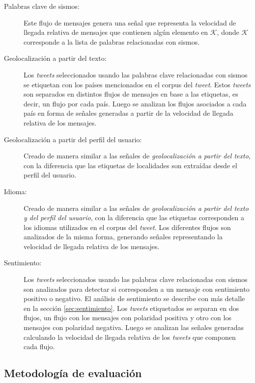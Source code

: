 \begin{description}

\item[Palabras clave de sismos:] Este flujo de mensajes genera una señal que representa la velocidad de llegada relativa de mensajes que contienen algún elemento en $\mathcal{K}$, donde $\mathcal{K}$ corresponde a la lista de palabras relacionadas con sismos. 
\item[Geolocalización a partir del texto:] Los \textit{tweets} seleccionados usando las palabras clave relacionadas con sismos se etiquetan con los países mencionados en el corpus del \textit{tweet}. Estos \textit{tweets} son separados en distintos flujos de mensajes en base a las etiquetas, es decir, un flujo por cada país. Luego se analizan los flujos asociados a cada país en forma de señales generadas a partir de la velocidad de llegada relativa de los mensajes. 
\item[Geolocalización a partir del perfil del usuario:] Creado de manera similar a las señales de \textit{geolocalización a partir del texto}, con la diferencia que las etiquetas de localidades son extraídas desde el perfil del usuario.
\item[Idioma:] Creado de manera similar a las señales de \textit{geolocalización a partir del texto y del perfil del usuario}, con la diferencia que las etiquetas corresponden a los idiomas utilizados en el corpus del \textit{tweet}. Los diferentes flujos son analizados de la misma forma, generando señales representando la velocidad de llegada relativa de los mensajes. 
\item[Sentimiento:] Los \textit{tweets} seleccionados usando las palabras clave relacionadas con sismos son analizados para detectar si corresponden a un mensaje con sentimiento positivo o negativo. El análisis de sentimiento se describe con más detalle en la sección \ref{sec:sentimiento}. Los \textit{tweets} etiquetados se separan en dos flujos, un flujo con los mensajes con polaridad positiva y otro con los mensajes con polaridad negativa. Luego se analizan las señales generadas calculando la velocidad de llegada relativa de los \textit{tweets} que componen cada flujo.

\end{description}

\subsection{Metodología de evaluación}

